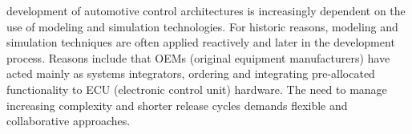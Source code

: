
% 
% 
% 
% 

 development of automotive control architectures is increasingly dependent on the use of modeling and simulation technologies.
For historic reasons, modeling and simulation techniques are often applied reactively and later in the development process.
Reasons include that OEMs (original equipment manufacturers) have acted mainly as systems integrators, ordering and integrating pre-allocated functionality to ECU (electronic control unit) hardware.
The need to manage increasing complexity and shorter release cycles demands flexible and collaborative approaches.
